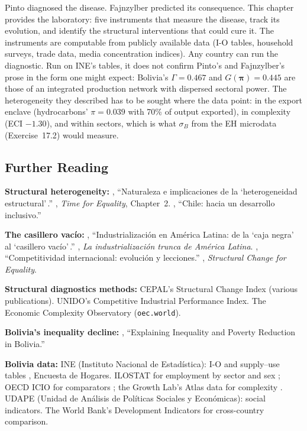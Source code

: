 \documentclass[../structural_economics_book.tex]{subfiles}
\begin{document}
Pinto diagnosed the disease. Fajnzylber predicted its consequence. This chapter provides the laboratory: five instruments that measure the disease, track its evolution, and identify the structural interventions that could cure it. The instruments are computable from publicly available data (I-O tables, household surveys, trade data, media concentration indices). Any country can run the diagnostic. Run on INE's tables, it does not confirm Pinto's and Fajnzylber's prose in the form one might expect: Bolivia's $\Gamma = 0.467$ and $G(\boldsymbol{\pi}) = 0.445$ are those of an integrated production network with dispersed sectoral power. The heterogeneity they described has to be sought where the data point: in the export enclave (hydrocarbons' $\pi = 0.039$ with 70\% of output exported), in complexity (ECI $-1.30$), and within sectors, which is what $\sigma_B$ from the EH microdata (Exercise~17.2) would measure.


\subsection*{Further Reading}

\textbf{Structural heterogeneity:} \citet{pinto1970naturaleza}, ``Naturaleza e implicaciones de la `heterogeneidad estructural'\,.'' \citet{cepal2010time}, \textit{Time for Equality}, Chapter~2. \citet{infante2009chile}, ``Chile: hacia un desarrollo inclusivo.''

\textbf{The casillero vac\'{i}o:} \citet{fajnzylber1990industrializacion}, ``Industrializaci\'{o}n en Am\'{e}rica Latina: de la `caja negra' al `casillero vac\'{i}o'\,.'' \citet{fajnzylber1983industrializacion}, \textit{La industrializaci\'{o}n trunca de Am\'{e}rica Latina}. \citet{fajnzylber1988competitividad}, ``Competitividad internacional: evoluci\'{o}n y lecciones.'' \citet{cepal2012structural}, \textit{Structural Change for Equality}.

\textbf{Structural diagnostics methods:} CEPAL's Structural Change Index (various publications). UNIDO's Competitive Industrial Performance Index. The Economic Complexity Observatory (\texttt{oec.world}).

\textbf{Bolivia's inequality decline:} \citet{vargas2015explaining}, ``Explaining Inequality and Poverty Reduction in Bolivia.''

\textbf{Bolivia data:} INE (Instituto Nacional de Estad\'{i}stica): I-O and supply--use tables \citep{ine2026sut}, Encuesta de Hogares. ILOSTAT for employment by sector and sex \citep{ilo2026ilostat}; OECD ICIO for comparators \citep{oecd2023icio,oecd2021icio}; the Growth Lab's Atlas data for complexity \citep{growthlab2026atlas}. UDAPE (Unidad de An\'{a}lisis de Pol\'{i}ticas Sociales y Econ\'{o}micas): social indicators. The World Bank's Development Indicators for cross-country comparison.
\end{document}
